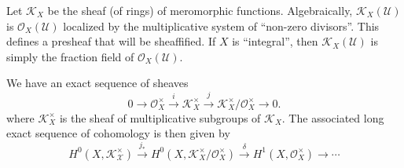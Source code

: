 Let $\mathcal{K}_X$ be the sheaf (of rings) of meromorphic functions. Algebraically, $\mathcal{K}_X(\mathcal{U})$ is $\mathcal{O}_X(\mathcal{U})$ localized by the multiplicative system of ``non-zero divisors''. This defines a presheaf that will be sheaffified. If $X$ is ``integral'', then $\mathcal{K}_X(\mathcal{U})$ is simply the fraction field of $\mathcal{O}_X(\mathcal{U})$.

We have an exact sequence of sheaves 
\[
0\to \mathcal{O}_X^\times \overset{i}{\to} \mathcal{K}_X^\times \overset{j}{\to} \mathcal{K}_X^\times/\mathcal{O}_X^\times \to 0.
\]
where $\mathcal{K}_X^\times$ is the sheaf of multiplicative subgroups of $\mathcal{K}_X$. The associated long exact sequence of cohomology is then given by 
\[
H^0(X,\mathcal{K_X^\times})\overset{j_*}{\to } H^0(X,\mathcal{K}_X^\times/\mathcal{O}_X^\times) \overset{\delta}{\to} H^1(X,\mathcal{O}_X^\times)\to \cdots
\]